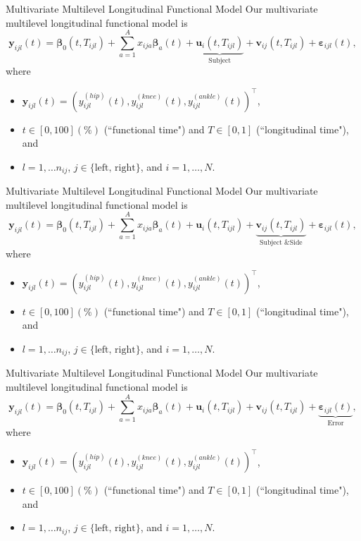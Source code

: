 \documentclass[aspectratio=128,xcolor=dvipsnames, notes]{beamer}
\newcommand{\1}{\mathbf{1}}
\newcommand{\boldbeta}{\boldsymbol{\beta}}
\newcommand{\boldy}{\mathbf{y}}
\begin{document}
\begin{frame}[noframenumbering]{Multivariate Multilevel Longitudinal Functional Model \parencite{gunning_multivariate_2023}}
Our multivariate multilevel longitudinal functional model is 
$$
\boldy_{ijl} (t) = \boldbeta_0(t, T_{ijl}) + \sum_{a=1}^A x_{ija} \boldbeta_{a} (t) + \underbrace{\mathbf{u}_{i} (t, T_{ijl})}_{\text{Subject}} + \mathbf{v}_{ij} (t, T_{ijl}) + \boldsymbol{\varepsilon}_{ijl} (t),
$$
where
\begin{itemize}
\small
    \item $\boldy_{ijl} (t) = \left(y_{ijl}^{(hip)} (t), y_{ijl}^{(knee)} (t), y_{ijl}^{(ankle)} (t)\right)^\top$,
    \item $t \in [0, 100](\%)$ (``functional time") and $T \in [0, 1]$ (``longitudinal time"), and
    \item $l = 1, \dots n_{ij}$, $j \in \{\text{left, right}\}$, and $i = 1, \dots, N$.
\end{itemize}
\end{frame}

\begin{frame}[noframenumbering]{Multivariate Multilevel Longitudinal Functional Model \parencite{gunning_multivariate_2023}}
Our multivariate multilevel longitudinal functional model is 
$$
\boldy_{ijl} (t) = \boldbeta_0(t, T_{ijl}) + \sum_{a=1}^A x_{ija} \boldbeta_{a} (t) + \mathbf{u}_{i} (t, T_{ijl}) + \underbrace{\mathbf{v}_{ij} (t, T_{ijl})}_{\text{Subject \& Side}} + \boldsymbol{\varepsilon}_{ijl} (t),
$$
where
\begin{itemize}
\small
    \item $\boldy_{ijl} (t) = \left(y_{ijl}^{(hip)} (t), y_{ijl}^{(knee)} (t), y_{ijl}^{(ankle)} (t)\right)^\top$,
    \item $t \in [0, 100](\%)$ (``functional time") and $T \in [0, 1]$ (``longitudinal time"), and
    \item $l = 1, \dots n_{ij}$, $j \in \{\text{left, right}\}$, and $i = 1, \dots, N$.
\end{itemize}
\end{frame}

\begin{frame}[noframenumbering]{Multivariate Multilevel Longitudinal Functional Model \parencite{gunning_multivariate_2023}}
Our multivariate multilevel longitudinal functional model is 
$$
\boldy_{ijl} (t) = \boldbeta_0(t, T_{ijl}) + \sum_{a=1}^A x_{ija} \boldbeta_{a} (t) + \mathbf{u}_{i} (t, T_{ijl}) + \mathbf{v}_{ij} (t, T_{ijl}) + \underbrace{\boldsymbol{\varepsilon}_{ijl} (t)}_{\text{Error}},
$$
where
\begin{itemize}
\small
    \item $\boldy_{ijl} (t) = \left(y_{ijl}^{(hip)} (t), y_{ijl}^{(knee)} (t), y_{ijl}^{(ankle)} (t)\right)^\top$,
    \item $t \in [0, 100](\%)$ (``functional time") and $T \in [0, 1]$ (``longitudinal time"), and
    \item $l = 1, \dots n_{ij}$, $j \in \{\text{left, right}\}$, and $i = 1, \dots, N$.
\end{itemize}
\end{frame}
\end{document}
